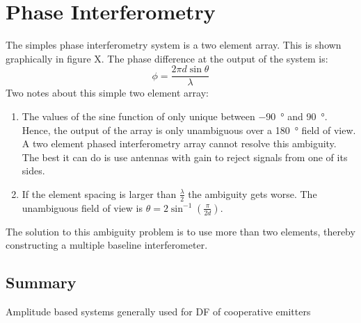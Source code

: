 \section{Phase Interferometry}
The simples phase interferometry system is a two element array. This is shown graphically in figure X. The phase difference at the output of the system is:
\begin{equation}
\phi = \frac{2 \pi d \sin \theta}{\lambda}
\end{equation}
Two notes about this simple two element array:
\begin{enumerate}
  \item The values of the sine function of only unique between \SI{-90}{\degree} and \SI{90}{\degree}. Hence, the output of the array is only unambiguous over a \SI{180}{\degree} field of view. A two element phased interferometry array cannot resolve this ambiguity. The best it can do is use antennas with gain to reject signals from one of its sides. 
 \item If the element spacing is larger than \(\frac{\lambda}{2}\) the ambiguity gets worse. The unambiguous field of view is \(\theta = 2 \sin^{-1}(\frac{\pi}{2d})\).
 \end{enumerate}
 The solution to this ambiguity problem is to use more than two elements, thereby constructing a multiple baseline interferometer. 

\subsection{Summary}
Amplitude based systems generally used for DF of cooperative emitters \cite{jenkins1991smallaperture}

